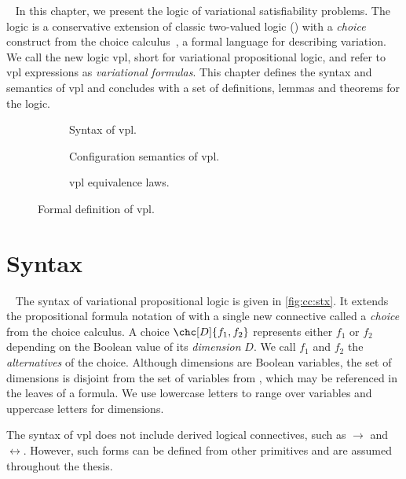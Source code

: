 ~\label{chapter:vpl}
%
In this chapter, we present the logic of variational satisfiability problems.
%
The logic is a conservative extension of classic two-valued logic (\pl{})
with a \emph{choice} construct from the choice
calculus~\cite{EW11tosem,Walk13thesis}, a formal language for describing
variation. We call the new logic \acs{vpl}, short for variational propositional
logic, and refer to \ac{vpl} expressions as \emph{variational formulas}.
%
This chapter defines the syntax and semantics of \ac{vpl} and concludes with a
set of definitions, lemmas and theorems for the logic.
%
\begin{figure}
  \begin{subfigure}[t]{\linewidth}
    \centering
    
    \caption{Syntax of \ac{vpl}.}%
    \label{fig:cc:stx}
  \end{subfigure}
%
  \begin{subfigure}[t]{\linewidth}
    
    \centering
    \caption{Configuration semantics of \ac{vpl}.}%
    \label{fig:cc:cfg}
  \end{subfigure}
%
  \begin{subfigure}[t]{\linewidth}
    
    \centering
    \caption{\ac{vpl} equivalence laws.}%
    \label{fig:cc:eqv}
  \end{subfigure}
\caption{Formal definition of \ac{vpl}.}%
\label{fig:cc}
\end{figure}
%
%
\section{Syntax}
~\label{section:syntax}
%
The syntax of variational propositional logic is given in
\autoref{fig:cc:stx}. It extends the propositional formula notation of \pl{}
with a single new connective called a \emph{choice} from the choice calculus.
%
A choice $\chc[D]{f_1,f_2}$ represents either $f_1$ or $f_2$ depending on the
Boolean value of its \emph{dimension} $D$. We call $f_1$ and $f_2$ the
\emph{alternatives} of the choice.
%
Although dimensions are Boolean variables, the set of dimensions is disjoint
from the set of variables from \pl{}, which may be referenced in the leaves of
a formula. We use lowercase letters to range over variables and uppercase
letters for dimensions.

The syntax of \ac{vpl} does not include derived logical connectives, such as
$\rightarrow$ and $\leftrightarrow$. However, such forms can be defined
  from other primitives and are assumed throughout the thesis.

